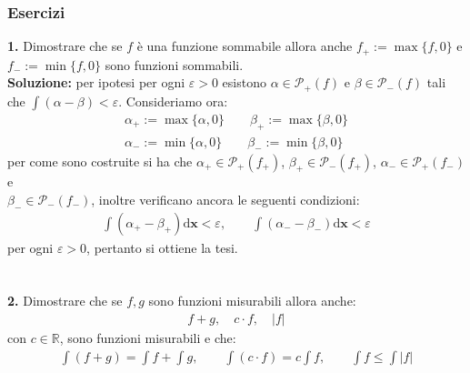 \documentclass{article}
\numberwithin{equation}{subsection}
\begin{document}
\subsubsection{Esercizi}
\textbf{1.} Dimostrare che se $f$ è una funzione sommabile allora anche $f_+ := \max \{ f, 0 \}$ e $f_- := \min \{ f, 0 \}$ sono funzioni sommabili. \\

\textbf{Soluzione:} per ipotesi per ogni $\varepsilon > 0$ esistono $\alpha \in \mathcal{P}_+(f)$ e $\beta \in \mathcal{P}_-(f)$ tali che $\int (\alpha - \beta) < \varepsilon$. Consideriamo ora:
\begin{gather*}
    \alpha_+ := \max \{ \alpha, 0 \} \qquad \beta_+ := \max \{ \beta, 0 \}  \\
    \alpha_- := \min \{ \alpha, 0 \} \qquad \beta_- := \min \{ \beta, 0 \} 
\end{gather*}
per come sono costruite si ha che $\alpha_+ \in \mathcal{P}_+(f_+)$, $\beta_+ \in \mathcal{P}_-(f_+)$, $\alpha_- \in \mathcal{P}_+(f_-)$ e \\ $\beta_- \in \mathcal{P}_-(f_-)$, inoltre verificano ancora le seguenti condizioni:
\begin{gather*}
    \int (\alpha_+ - \beta_+) \mathrm{d}\mathbf{x} < \varepsilon, \qquad \int (\alpha_- - \beta_-) \mathrm{d}\mathbf{x} < \varepsilon 
\end{gather*}
per ogni $\varepsilon > 0$, pertanto si ottiene la tesi. \\ \\ \\
\textbf{2.} Dimostrare che se $f, g$ sono funzioni misurabili allora anche:
\begin{gather*}
    f + g, \quad c \cdot f, \quad | f | 
\end{gather*}
con $c \in \mathbb{R}$, sono funzioni misurabili e che:
\begin{gather*}
    \int (f + g) = \int f + \int g, \qquad \int (c \cdot f) = c \int f, \qquad \int f \leq \int |f| 
\end{gather*}\\
\end{document}

